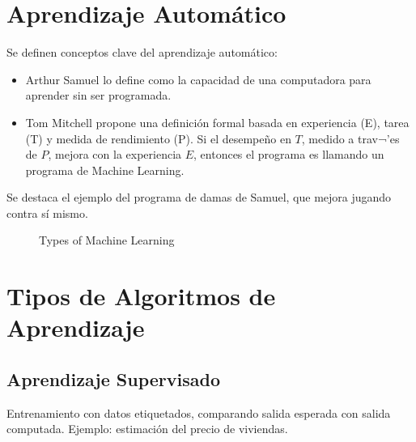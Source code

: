 \documentclass[12pt]{article}
\begin{document}
\section{Aprendizaje Autom\'atico}
Se definen conceptos clave del aprendizaje autom\'atico:
\begin{itemize}
  \item Arthur Samuel lo define como la capacidad de una computadora para aprender sin ser programada.
  \item Tom Mitchell propone una definici\'on formal basada en experiencia (E), tarea (T) y medida de rendimiento (P). Si el desempe\~no en $T$, medido a trav¬'es de $P$, mejora con la experiencia  $E$, entonces el programa es llamando un programa de Machine Learning.
\end{itemize}
Se destaca el ejemplo del programa de damas de Samuel, que mejora jugando contra s\'i mismo.


\begin{figure}[h!]
\centering
{}
\caption{Types of Machine Learning}
\end{figure}


\section{Tipos de Algoritmos de Aprendizaje}
\subsection{Aprendizaje Supervisado}
Entrenamiento con datos etiquetados, comparando salida esperada con salida computada. Ejemplo: estimaci\'on del precio de viviendas.
\end{document}
